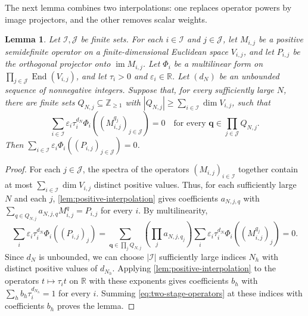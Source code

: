 \documentclass[11pt,a4paper]{article}
\theoremstyle{plain}
\newtheorem{lemma}[theorem]{Lemma}
\theoremstyle{definition}
\DeclareMathOperator{\im}{im}
\newcommand{\R}{\mathbb{R}}
\newcommand{\Z}{\mathbb{Z}}
\begin{document}
The next lemma combines two interpolations: one replaces operator powers
by image projectors, and the other removes scalar weights.
\begin{lemma}\label{lem:two-stage-interpolation}
 Let $\mathcal I,\mathcal J$ be finite sets. For each $i\in\mathcal I$ and $j\in\mathcal J$, let
 $M_{i,j}$ be a positive semidefinite operator on a finite-dimensional
 Euclidean space $V_{i,j}$, and let $P_{i,j}$ be the orthogonal projector
 onto $\im M_{i,j}$. Let $\Phi_i$ be a multilinear form on
 $\prod_{j\in\mathcal J}\operatorname{End}(V_{i,j})$, and let
 $\tau_i>0$ and $\varepsilon_i\in\R$.
 Let $(d_N)$ be an unbounded sequence of nonnegative integers.
 Suppose that, for every sufficiently large $N$, there are finite
 sets $Q_{N,j}\subseteq\Z_{\geq1}$ with
 $|Q_{N,j}|\geq\sum_{i\in\mathcal I}\dim V_{i,j}$,
 such that
 \begin{equation}\label{eq:two-stage-samples}
  \sum_{i\in\mathcal I}\varepsilon_i\tau_i^{d_N}
     \Phi_i((M_{i,j}^{q_j})_{j\in\mathcal J})=0
  \quad\text{for every }\mathbf q\in\prod_{j\in\mathcal J}Q_{N,j}.
 \end{equation}
 Then $\sum_{i\in\mathcal I}\varepsilon_i\Phi_i((P_{i,j})_{j\in\mathcal J})=0$.
\end{lemma}
\begin{proof}
 For each $j\in\mathcal J$, the spectra of the operators $(M_{i,j})_{i\in\mathcal I}$
 together contain at most $\sum_{i\in\mathcal I}\dim V_{i,j}$ distinct positive
 values. Thus, for each sufficiently large $N$ and each $j$,
 \cref{lem:positive-interpolation} gives coefficients $a_{N,j,q}$ with
 $\sum_{q\in Q_{N,j}}a_{N,j,q}M_{i,j}^q=P_{i,j}$ for every $i$.
 By multilinearity,
 \begin{equation}\label{eq:two-stage-operators}
  \sum_i\varepsilon_i\tau_i^{d_N}\Phi_i((P_{i,j})_j)
  =\sum_{\mathbf q\in\prod_jQ_{N,j}}
      \left(\prod_ja_{N,j,q_j}\right)
      \sum_i\varepsilon_i\tau_i^{d_N}\Phi_i((M_{i,j}^{q_j})_j)=0.
 \end{equation}
 Since $d_N$ is unbounded, we can choose $|\mathcal I|$ sufficiently large indices $N_h$
 with distinct positive values of $d_{N_h}$.
 Applying \cref{lem:positive-interpolation} to the operators
 $t\mapsto\tau_i t$ on $\R$ with these exponents gives coefficients $b_h$
 with $\sum_hb_h\tau_i^{d_{N_h}}=1$ for every $i$.
 Summing \cref{eq:two-stage-operators} at these indices with
 coefficients $b_h$ proves the lemma.
\end{proof}
\end{document}
